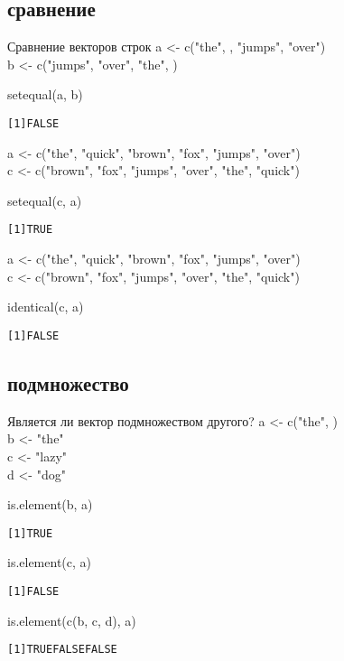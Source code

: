 \subsection{сравнение}
\begin{frame}[fragile]{Сравнение векторов строк}
a <- c("the"{}, {}, "jumps"{}, "over"{})\\
b <- c("jumps"{}, "over"{}, "the"{}, {})
\begin{itemize}
\mytem setequal(a, b)
\footnotesize
\begin{alltt}
[1] FALSE
\end{alltt}
\normalsize
\end{itemize}
\vfill
a <- c("the"{}, "quick"{}, "brown"{}, "fox"{}, "jumps"{}, "over"{})\\
c <- c("brown"{}, "fox"{}, "jumps"{}, "over"{}, "the"{}, "quick"{})
\begin{itemize}
\mytem setequal(c, a)
\footnotesize
\begin{alltt}
[1] TRUE
\end{alltt}
\normalsize
\end{itemize}
\vfill
a <- c("the"{}, "quick"{}, "brown"{}, "fox"{}, "jumps"{}, "over"{})\\
c <- c("brown"{}, "fox"{}, "jumps"{}, "over"{}, "the"{}, "quick"{})
\begin{itemize}
\mytem identical(c, a)
\footnotesize
\begin{alltt}
[1] FALSE
\end{alltt}
\normalsize
\end{itemize}
\end{frame}
\subsection{подмножество}
\begin{frame}[fragile]{Является ли вектор подмножеством другого?}
a <- c("the"{}, {})\\
b <- "the"\\
c <- "lazy"\\
d <- "dog"
\begin{itemize}
\vfill
\mytem is.element(b, a)
\footnotesize
\begin{alltt}
[1] TRUE
\end{alltt}
\normalsize
\vfill
\mytem is.element(c, a)
\footnotesize
\begin{alltt}
[1] FALSE
\end{alltt}
\normalsize
\vfill
\mytem is.element(c(b, c, d), a)
\footnotesize
\begin{alltt}
[1] TRUE FALSE FALSE
\end{alltt}
\normalsize
\end{itemize}
\end{frame}
